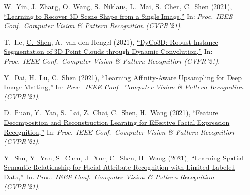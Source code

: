\documentclass[9pt, a4paper]{article}
\newcommand{\years}[1]{\marginnote{\scriptsize #1}}
\def\highlight{\uline}
\begin{document}
\medskip

\years{2021} W.~Yin, J.~Zhang, O.~Wang, S.~Niklaus, L.~Mai, S.~Chen, \highlight{C.~Shen} (2021),
\href{http://www.google.com/search?lr=&ie=UTF-8&oe=UTF-8&q=Learning+to+Recover+3D+Scene+Shape+from+a+Single+Image+Wei+Yin%2C+Jianming+Zhang%2C+Oliver+Wang%2C+Simon+Niklaus%2C+Long+Mai%2C+Simon+Chen%2C+Chunhua+Shen}{``Learning to Recover {3D} Scene Shape from a Single Image,{}''}
In: \emph{Proc.\ IEEE Conf.\  Computer Vision \& Pattern Recognition (CVPR'21)}.

\medskip

\years{2021} T.~He, \highlight{C.~Shen}, A.~van den Hengel (2021),
\href{http://www.google.com/search?lr=&ie=UTF-8&oe=UTF-8&q=DyCo3D%3A+Robust+Instance+Segmentation+of+3D+Point+Clouds+through+Dynamic+Convolution+Tong+He%2C+Chunhua+Shen%2C+Anton+van+den+Hengel}{``{DyCo3D}: Robust Instance Segmentation of 3D Point Clouds through Dynamic Convolution,{}''}
In: \emph{Proc.\ IEEE Conf.\  Computer Vision \& Pattern Recognition (CVPR'21)}.

\medskip

\years{2021} Y.~Dai, H.~Lu, \highlight{C.~Shen} (2021),
\href{http://www.google.com/search?lr=&ie=UTF-8&oe=UTF-8&q=Learning+Affinity-Aware+Upsampling+for+Deep+Image+Matting+Yutong+Dai%2C+Hao+Lu%2C+Chunhua+Shen}{``Learning Affinity-Aware Upsampling for Deep Image Matting,{}''}
In: \emph{Proc.\ IEEE Conf.\  Computer Vision \& Pattern Recognition (CVPR'21)}.

\medskip

\years{2021} D.~Ruan, Y.~Yan, S.~Lai, Z.~Chai, \highlight{C.~Shen}, H.~Wang (2021),
\href{http://www.google.com/search?lr=&ie=UTF-8&oe=UTF-8&q=Feature+Decomposition+and+Reconstruction+Learning+for+Effective+Facial+Expression+Recognition+Delian+Ruan%2C+Yan+Yan%2C+Shenqi+Lai%2C+Zhenhua+Chai%2C+Chunhua+Shen%2C+Hanzi+Wang}{``Feature Decomposition and Reconstruction Learning for Effective Facial Expression Recognition,{}''}
In: \emph{Proc.\ IEEE Conf.\  Computer Vision \& Pattern Recognition (CVPR'21)}.

\medskip

\years{2021} Y.~Shu, Y.~Yan, S.~Chen, J.~Xue, \highlight{C.~Shen}, H.~Wang (2021),
\href{http://www.google.com/search?lr=&ie=UTF-8&oe=UTF-8&q=Learning+Spatial-Semantic+Relationship+for+Facial+Attribute+Recognition+with+Limited+Labeled+Data+Ying+Shu%2C+Yan+Yan%2C+Si+Chen%2C+Jing-Hao+Xue%2C+Chunhua+Shen%2C+Hanzi+Wang}{``Learning Spatial-Semantic Relationship for Facial Attribute Recognition with Limited Labeled Data,{}''}
In: \emph{Proc.\ IEEE Conf.\  Computer Vision \& Pattern Recognition (CVPR'21)}.
\end{document}
